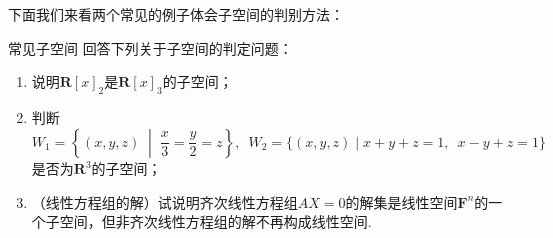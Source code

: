 下面我们来看两个常见的例子体会子空间的判别方法：
\begin{example}{}{常见子空间}
    回答下列关于子空间的判定问题：
    \begin{enumerate}
        \item \label{item:2:常见子空间:1}
              说明$\mathbf{R}[x]_2$是$\mathbf{R}[x]_3$的子空间；

        \item \label{item:2:常见子空间:2}
              判断$W_1=\left\{(x,y,z) \;\middle|\; \dfrac{x}{3}=\dfrac{y}{2}=z\right\},\enspace W_2=\{(x,y,z) \mid x+y+z=1,\enspace x-y+z=1\}$是否为$\mathbf{R}^3$的子空间；

        \item \label{item:2:常见子空间:3}
              （线性方程组的解）试说明齐次线性方程组$AX=0$的解集是线性空间$\mathbf{F}^n$的一个子空间，但非齐次线性方程组的解不再构成线性空间.
    \end{enumerate}
\end{example}

